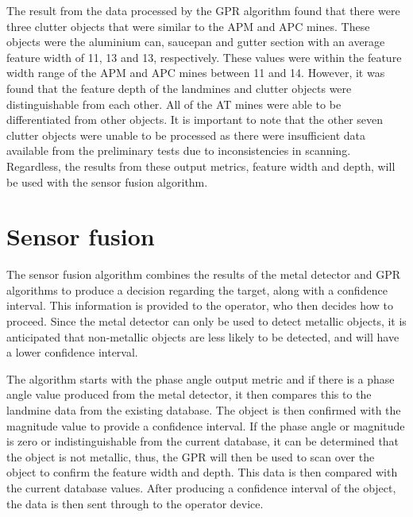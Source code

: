 \documentclass[main.tex]{subfiles}
\begin{document}
The result from the data processed by the GPR algorithm found that there were three clutter objects that were similar to the APM and APC mines. These objects were the aluminium can, saucepan and gutter section with an average feature width of 11, 13 and 13, respectively. These values were within the feature width range of the APM and APC mines between 11 and 14. However, it was found that the feature depth of the landmines and clutter objects were distinguishable from each other. All of the AT mines were able to be differentiated from other objects. It is important to note that the other seven clutter objects were unable to be processed as there were insufficient data available from the preliminary tests due to inconsistencies in scanning. Regardless, the results from these output metrics, feature width and depth, will be used with the sensor fusion algorithm. 

\section{Sensor fusion}
The sensor fusion algorithm combines the results of the metal detector and GPR algorithms to produce a decision regarding the target, along with a confidence interval. This information is provided to the operator, who then decides how to proceed. Since the metal detector can only be used to detect metallic objects, it is anticipated that non-metallic objects are less likely to be detected, and will have a lower confidence interval. 

The algorithm starts with the phase angle output metric and if there is a phase angle value produced from the metal detector, it then compares this to the landmine data from the existing database. The object is then confirmed with the magnitude value to provide a confidence interval. If the phase angle or magnitude is zero or indistinguishable from the current database, it can be determined that the object is not metallic, thus, the GPR will then be used to scan over the object to confirm the feature width and depth. This data is then compared with the current database values. After producing a confidence interval of the object, the data is then sent through to the operator device.  

\end{document}
